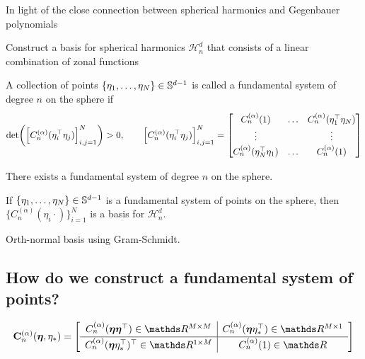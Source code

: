 In light of the close connection between spherical harmonics and Gegenbauer polynomials 


Construct a basis for spherical harmonics $\mathcal{H}_n^d$ that consists of a linear combination of zonal functions 

\begin{definition}
    A collection of points $\{\eta_1, \ldots, \eta_N \} \in \mathbb{S}^{d-1}$ is called a fundamental system of degree $n$ on the sphere if
    \begin{equation}
        \textrm{det}\left({\left[C_n^{(\alpha)}(\eta_i\transpose\eta_j)\right]_{i,j=1}^N}\right) > 0,\qquad
        {\left[C_n^{(\alpha)}(\eta_i\transpose\eta_j)\right]_{i,j=1}^N} = 
        \begin{bmatrix}
            C_n^{(\alpha)}(1) & \ldots & C_n^{(\alpha)}(\eta_1\transpose\eta_N) \\
            \vdots & & \vdots \\
            C_n^{(\alpha)}(\eta_N\transpose\eta_1) & \ldots & C_n^{(\alpha)}(1)
        \end{bmatrix}
    \end{equation}
\end{definition}

\begin{lemma}
    There exists a fundamental system of degree $n$ on the sphere.
\end{lemma}


\begin{theorem}
    If $\{\eta_1, \ldots, \eta_N \} \in \mathbb{S}^{d-1}$ is a fundamental system of points on the sphere, then $\{C_n^{(\alpha)}(\eta_i \cdot)\}_{i=1}^N$ is a basis for $\mathcal{H}_n^d$.
\end{theorem}

Orth-normal basis using Gram-Schmidt.

\subsection{How do we construct a fundamental system of points?}

\begin{equation}
    \renewcommand\arraystretch{1.3}
    \MC_n^{(\alpha)}(\veta, \eta_{*}) =
    \left[
        \begin{array}{c|c}
          C_n^{(\alpha)}(\veta\veta\transpose) \in \Reals^{M \times M} & C_n^{(\alpha)}(\veta\eta_{*}\transpose) \in \Reals^{M \times 1} \\
          \hline
          C_n^{(\alpha)}(\veta\eta_{*}\transpose)\transpose \in \Reals^{1 \times M} & C_n^{(\alpha)}(1) \in \Reals
        \end{array}
    \right]
\end{equation}

